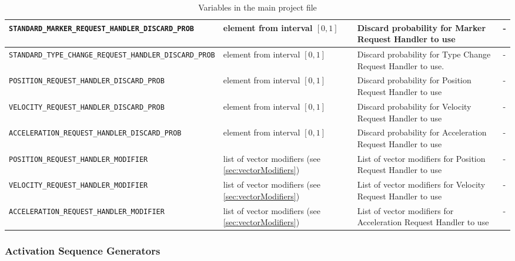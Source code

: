 \begin{sidewaystable}
\begin{tabular}{|l|p{}|p{}|p{}|}
		
		
		 \texttt{STANDARD\_MARKER\_REQUEST\_HANDLER\_DISCARD\_PROB} &  element from interval $[0,1]$ & Discard probability for Marker Request Handler to use & -\\\hline
		 
		\texttt{STANDARD\_TYPE\_CHANGE\_REQUEST\_HANDLER\_DISCARD\_PROB} & element from interval $[0,1]$ & Discard probability  for Type Change Request Handler to use. & -\\\hline
		
		\texttt{POSITION\_REQUEST\_HANDLER\_DISCARD\_PROB} & element from interval $[0,1]$ & Discard probability  for Position Request Handler to use & -\\\hline

		\texttt{VELOCITY\_REQUEST\_HANDLER\_DISCARD\_PROB} & element from interval $[0,1]$ & Discard probability  for Velocity Request Handler to use & -\\\hline

		\texttt{ACCELERATION\_REQUEST\_HANDLER\_DISCARD\_PROB} & element from interval $[0,1]$ & Discard probability  for Acceleration Request Handler to use & -\\\hline
		
		
		\texttt{POSITION\_REQUEST\_HANDLER\_MODIFIER} & list of vector modifiers (see \ref{sec:vectorModifiers}) & List of vector modifiers for Position Request Handler to use & -\\\hline

		\texttt{VELOCITY\_REQUEST\_HANDLER\_MODIFIER} & list of vector modifiers (see \ref{sec:vectorModifiers}) & List of vector modifiers for Velocity Request Handler to use & -\\\hline

		\texttt{ACCELERATION\_REQUEST\_HANDLER\_MODIFIER} & list of vector modifiers (see \ref{sec:vectorModifiers}) & List of vector modifiers for Acceleration Request Handler to use & -\\\hline		
				
	\end{tabular}
	\caption{Variables in the main project file}\label{tab:mainvars2}
\end{sidewaystable}
\enlargethispage*{2cm}
\thispagestyle{empty}
\clearpage

\subsubsection{Activation Sequence Generators}

